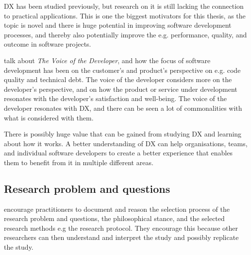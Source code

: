 \documentclass[english, 12pt, a4paper, sci, utf8, a-1b, online]{aaltothesis}
\begin{document}
DX has been studied previously, but research on it is still lacking the connection to practical applications. This is one the biggest motivators for this thesis, as the topic is novel and there is huge potential in improving software development processes, and thereby also potentially improve the e.g. performance, quality, and outcome in software projects.

\cite{voice-of-the-developer} talk about \textit{The Voice of the Developer}, and how the focus of software development has been on the customer's and product's perspective on e.g. code quality and technical debt. The voice of the developer considers more on the developer's perspective, and on how the product or service under development resonates with the developer's satisfaction and well-being. The voice of the developer resonates with DX, and there can be seen a lot of commonalities with what is considered with them.

There is possibly huge value that can be gained from studying DX and learning about how it works. A better understanding of DX can help organisations, teams, and individual software developers to create a better experience that enables them to benefit from it in multiple different areas.


\subsection{Research problem and questions}

\cite{easterbrook2008selecting} encourage practitioners to document and reason the selection process of the research problem and questions, the philosophical stance, and the selected research methods e.g the research protocol. They encourage this because other researchers can then understand and interpret the study and possibly replicate the study.
\end{document}
